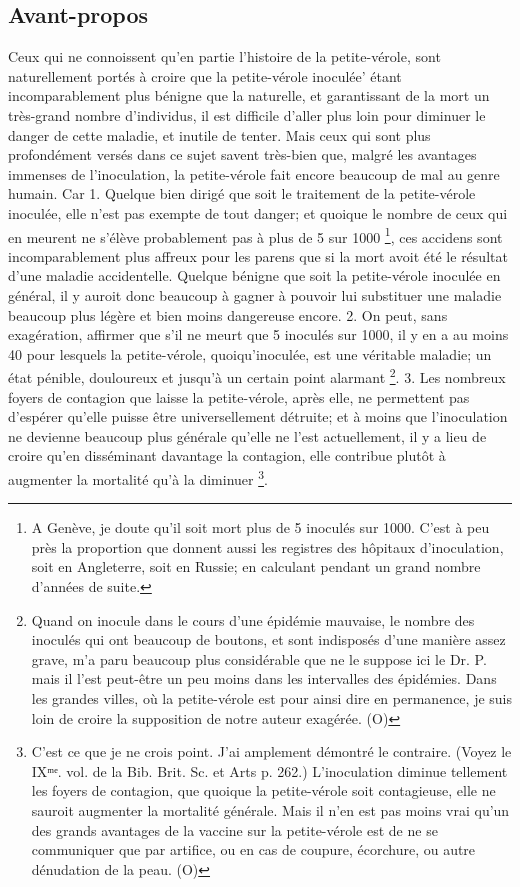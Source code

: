 \subsection{Avant-propos}
Ceux qui ne connoissent qu'en partie l'histoire de la petite-vérole, sont naturellement portés à croire que la petite-vérole inoculée' étant incomparablement plus bénigne que la naturelle, et garantissant de la mort un très-grand nombre d'individus, il est difficile d'aller plus loin pour diminuer le danger de cette maladie, et inutile de tenter. Mais ceux qui\setcounter{page}{265} sont plus profondément versés dans ce sujet savent très-bien que, malgré les avantages immenses de l'inoculation, la petite-vérole fait encore beaucoup de mal au genre humain. Car
1. Quelque bien dirigé que soit le traitement de la petite-vérole inoculée, elle n'est pas exempte de tout danger; et quoique le nombre de ceux qui en meurent ne s'élève probablement pas à plus de 5 sur 1000 \footnote{A Genève, je doute qu'il soit mort plus de 5 inoculés sur 1000. C'est à peu près la proportion que donnent aussi les registres des hôpitaux d'inoculation, soit en Angleterre, soit en Russie; en calculant pendant un grand nombre d'années de suite.}, ces accidens sont incomparablement plus affreux pour les parens que si la mort avoit été le résultat d'une maladie accidentelle. Quelque bénigne que soit la petite-vérole inoculée en général, il y auroit donc beaucoup à gagner à pouvoir lui substituer une maladie beaucoup plus légère et bien moins dangereuse encore.
2. On peut, sans exagération, affirmer que s'il ne meurt que 5 inoculés sur 1000, il y en a au moins 40 pour lesquels la petite-vérole, quoiqu'inoculée, est une véritable maladie;\setcounter{page}{266} un état pénible, douloureux et jusqu'à un certain point alarmant \footnote{Quand on inocule dans le cours d'une épidémie mauvaise, le nombre des inoculés qui ont beaucoup de boutons, et sont indisposés d'une manière assez grave, m'a paru beaucoup plus considérable que ne le suppose ici le Dr. P. mais il l'est peut-être un peu moins dans les intervalles des épidémies. Dans les grandes villes, où la petite-vérole est pour ainsi dire en permanence, je suis loin de croire la supposition de notre auteur exagérée. (O)}.
3. Les nombreux foyers de contagion que laisse la petite-vérole, après elle, ne permettent pas d'espérer qu'elle puisse être universellement détruite; et à moins que l'inoculation ne devienne beaucoup plus générale qu'elle ne l'est actuellement, il y a lieu de croire qu'en disséminant davantage la contagion, elle contribue plutôt à augmenter la mortalité qu'à la diminuer \footnote{C'est ce que je ne crois point. J'ai amplement démontré le contraire. (Voyez le IXᵐᵉ. vol. de la Bib. Brit. Sc. et Arts p. 262.) L'inoculation diminue tellement les foyers de contagion, que quoique la petite-vérole soit contagieuse, elle ne sauroit augmenter la mortalité générale. Mais il n'en est pas moins vrai qu'un des grands avantages de la vaccine sur la petite-vérole est de ne se communiquer que par artifice, ou en cas de coupure, écorchure, ou autre dénudation de la peau. (O)}.
